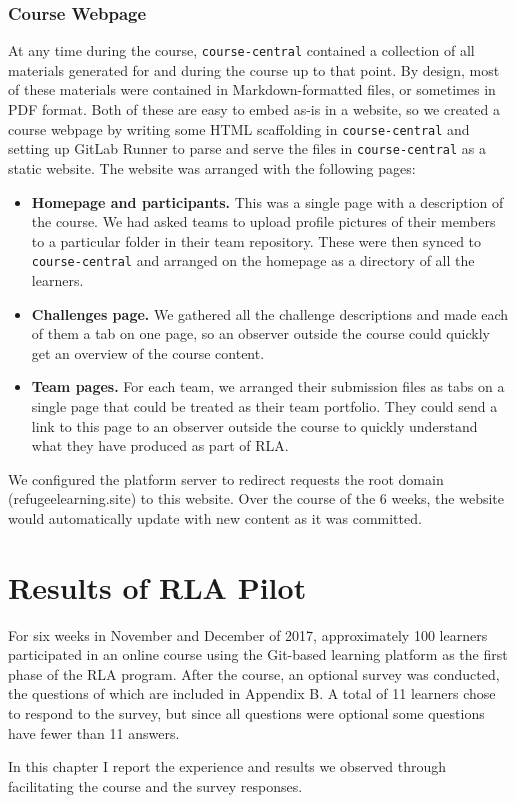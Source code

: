 \documentclass[12pt,twoside]{mitthesis}
\newcommand{\review}[1]{{#1}}
\begin{document}
\subsection{Course Webpage}

\review{At any time during the course, \texttt{course-central} contained a collection of all materials generated for and during the course up to that point. By design, most of these materials were contained in Markdown-formatted files, or sometimes in PDF format. Both of these are easy to embed as-is in a website, so we created a course webpage by writing some HTML scaffolding in \texttt{course-central} and setting up GitLab Runner to parse and serve the files in \texttt{course-central} as a static website. The website was arranged with the following pages:
\begin{itemize}
\item \textbf{Homepage and participants.} This was a single page with a description of the course. We had asked teams to upload profile pictures of their members to a particular folder in their team repository. These were then synced to \texttt{course-central} and arranged on the homepage as a directory of all the learners.
\item \textbf{Challenges page.} We gathered all the challenge descriptions and made each of them a tab on one page, so an observer outside the course could quickly get an overview of the course content.
\item \textbf{Team pages.} For each team, we arranged their submission files as tabs on a single page that could be treated as their team portfolio. They could send a link to this page to an observer outside the course to quickly understand what they have produced as part of RLA.
\end{itemize}
We configured the platform server to redirect requests the root domain (refugeelearning.site) to this website. Over the course of the 6 weeks, the website would automatically update with new content as it was committed.
}

\chapter{Results of RLA Pilot}

\review{For six weeks in November and December of 2017, approximately 100 learners participated in an online course using the Git-based learning platform as the first phase of the RLA program. After the course, an optional survey was conducted, the questions of which are included in Appendix B. A total of 11 learners chose to respond to the survey, but since all questions were optional some questions have fewer than 11 answers.

In this chapter I report the experience and results we observed through facilitating the course and the survey responses.}
\end{document}
